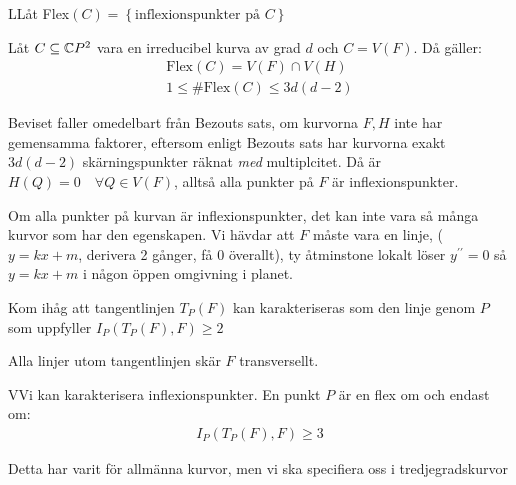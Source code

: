 \begin{theo}
  LLåt Flex$(C) = \left\{\text{inflexionspunkter på } C\right\}$\par
  \noindent Låt $C\subseteq \mathbb{C} P^2$ vara en irreducibel kurva av grad $d$ och $C = V(F)$. Då gäller:
  \begin{equation*}
    \begin{gathered}
      \text{Flex}(C) = V(F)\cap V(H)\\
      1\leq \text{\#Flex}(C)\leq 3d(d-2)
    \end{gathered}
  \end{equation*}
\end{theo}
\par\bigskip
\noindent Beviset faller omedelbart från Bezouts sats, om kurvorna $F,H$ inte har gemensamma faktorer, eftersom enligt Bezouts sats har kurvorna exakt $3d(d-2)$ skärningspunkter räknat \textit{med} multiplcitet. Då är $H(Q) = 0\quad\forall Q\in V(F)$, alltså alla punkter på $F$ är inflexionspunkter.\par
\noindent Om alla punkter på kurvan är inflexionspunkter, det kan inte vara så många kurvor som har den egenskapen. Vi hävdar att $F$ måste vara en linje, ($y = kx+m$, derivera 2 gånger, få 0 överallt), ty åtminstone lokalt löser $y^{\prime\prime}=0$ så $y=kx+m$ i någon öppen omgivning i planet.
\par\bigskip
\noindent Kom ihåg att tangentlinjen $T_P(F)$ kan karakteriseras som den linje genom $P$ som uppfyller $I_P(T_P(F), F)\geq2$\par
\noindent Alla linjer utom tangentlinjen skär $F$ transversellt.
\par\bigskip
\begin{theo}
  VVi kan karakterisera inflexionspunkter. En punkt $P$ är en flex om och endast om:
  \begin{equation*}
    \begin{gathered}
      I_P(T_P(F),F)\geq3
    \end{gathered}
  \end{equation*}
\end{theo}
\par\bigskip
\noindent Detta har varit för allmänna kurvor, men vi ska specifiera oss i tredjegradskurvor
\par\bigskip
